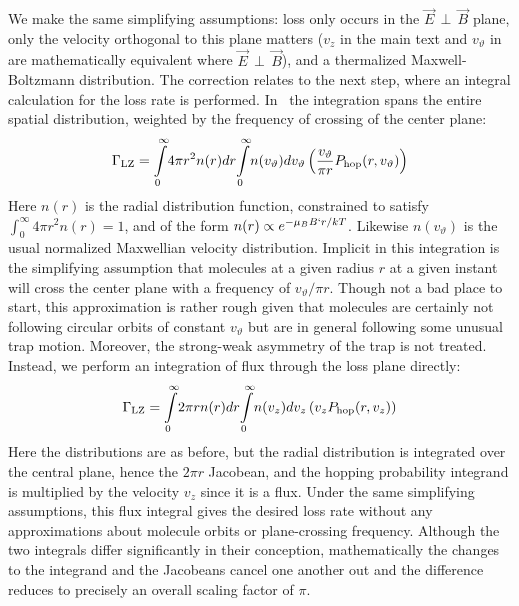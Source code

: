 \documentclass[%
 reprint,
 amsmath,amssymb,
 aps,
prl,
]{revtex4-1}
\newcommand{\epb}{{$\vec{E}\,{\perp}\,\vec{B}$}}
\begin{document}
We make the same simplifying assumptions: loss only occurs in the \epb{} plane, only the velocity orthogonal to this plane matters ($v_z$ in the main text and $v_\vartheta$ in~\cite{Stuhl2013} are mathematically equivalent where \epb{}), and a thermalized Maxwell-Boltzmann distribution.
The correction relates to the next step, where an integral calculation for the loss rate is performed.
In~\cite{Stuhl2013} the integration spans the entire spatial distribution, weighted by the frequency of crossing of the center plane:
\begin{equation}
\Gamma_\text{LZ}=\int\displaylimits_0^\infty\!4\pi r^2n(r)dr\!\int\displaylimits_0^\infty \!n(v_\vartheta)dv_\vartheta\left( \frac{v_\vartheta}{\pi r} P_\text{hop}(r,v_\vartheta)\right)
\end{equation}
Here $n(r)$ is the radial distribution function, constrained to satisfy $\int_0^\infty 4\pi r^2n(r)=1$, and of the form $n(r)\propto e^{-\mu_BB`r/kT}$. 
Likewise $n(v_\vartheta)$ is the usual normalized Maxwellian velocity distribution. 
Implicit in this integration is the simplifying assumption that molecules at a given radius $r$ at a given instant will cross the center plane with a frequency of $v_\vartheta/\pi r$.
Though not a bad place to start, this approximation is rather rough given that molecules are certainly not following circular orbits of constant $v_\vartheta$ but are in general following some unusual trap motion.
Moreover, the strong-weak asymmetry of the trap is not treated.
Instead, we perform an integration of flux through the loss plane directly:
\begin{equation}
\Gamma_\text{LZ}=\int\displaylimits_0^\infty\!2\pi r n(r)dr\!\int\displaylimits_0^\infty\! n(v_z)dv_z\left(v_z P_\text{hop}(r,v_z)\right)
\end{equation}
Here the distributions are as before, but the radial distribution is integrated over the central plane, hence the $2\pi r$ Jacobean, and the hopping probability integrand is multiplied by the velocity $v_z$ since it is a flux.
Under the same simplifying assumptions, this flux integral gives the desired loss rate without any approximations about molecule orbits or plane-crossing frequency.
Although the two integrals differ significantly in their conception, mathematically the changes to the integrand and the Jacobeans cancel one another out and the difference reduces to precisely an overall scaling factor of $\pi$. 
\end{document}
